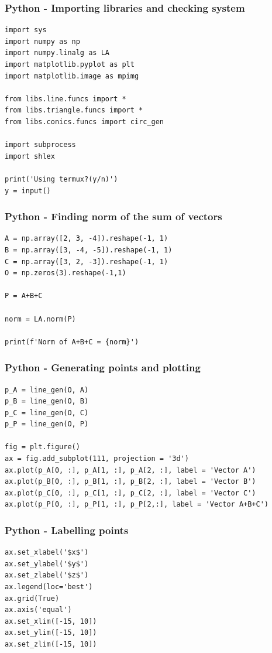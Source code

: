\documentclass{beamer}
\begin{document}
\begin{frame}[fragile]
    \frametitle{Python - Importing libraries and checking system}
    \begin{lstlisting}
import sys
import numpy as np
import numpy.linalg as LA
import matplotlib.pyplot as plt
import matplotlib.image as mpimg

from libs.line.funcs import *
from libs.triangle.funcs import *
from libs.conics.funcs import circ_gen

import subprocess
import shlex

print('Using termux?(y/n)')
y = input()
\end{lstlisting}
\end{frame}

\begin{frame}[fragile]
    \frametitle{Python - Finding norm of the sum of vectors}
    \begin{lstlisting}
A = np.array([2, 3, -4]).reshape(-1, 1)
B = np.array([3, -4, -5]).reshape(-1, 1)
C = np.array([3, 2, -3]).reshape(-1, 1)
O = np.zeros(3).reshape(-1,1)

P = A+B+C

norm = LA.norm(P)

print(f'Norm of A+B+C = {norm}')
\end{lstlisting}
\end{frame}

\begin{frame}[fragile]
    \frametitle{Python - Generating points and plotting}
    \begin{lstlisting}
p_A = line_gen(O, A)
p_B = line_gen(O, B)
p_C = line_gen(O, C)
p_P = line_gen(O, P)

fig = plt.figure()
ax = fig.add_subplot(111, projection = '3d')
ax.plot(p_A[0, :], p_A[1, :], p_A[2, :], label = 'Vector A')
ax.plot(p_B[0, :], p_B[1, :], p_B[2, :], label = 'Vector B')
ax.plot(p_C[0, :], p_C[1, :], p_C[2, :], label = 'Vector C')
ax.plot(p_P[0, :], p_P[1, :], p_P[2,:], label = 'Vector A+B+C')
\end{lstlisting}
\end{frame}

\begin{frame}[fragile]
    \frametitle{Python - Labelling points}
    \begin{lstlisting}
ax.set_xlabel('$x$')
ax.set_ylabel('$y$')
ax.set_zlabel('$z$')
ax.legend(loc='best')
ax.grid(True) 
ax.axis('equal')
ax.set_xlim([-15, 10])
ax.set_ylim([-15, 10])
ax.set_zlim([-15, 10])
    \end{lstlisting}
\end{frame}
\end{document}
